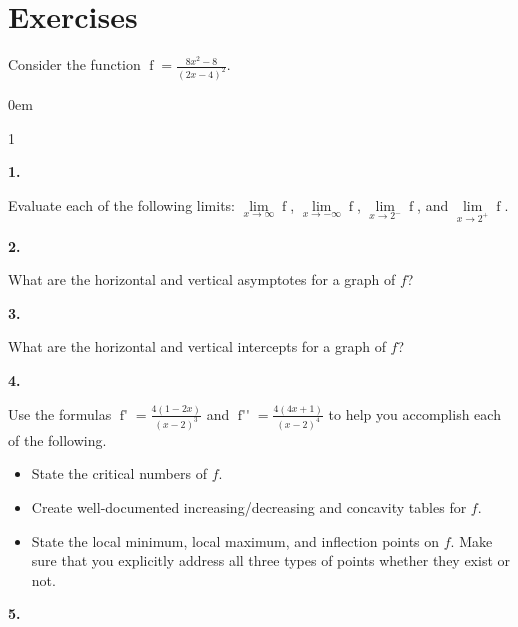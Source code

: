 \documentclass[12pt,]{book}
\theoremstyle{plain}
\theoremstyle{definition}
\numberwithin{equation}{section}
\newenvironment{exercisegroup}%
{\medskip\noindent}%
{\par\bigskip}%
\newlength{\exercisegroupindent}%
\newlength{\exercisegroupitemwidth}%
\newenvironment{exercisegrouplist}%
{\vspace{-\partopsep}%
\begin{adjustwidth}{\exercisegroupindent}{0em}}%
{\end{adjustwidth}%
\vspace{-\partopsep}%
\vspace{\baselineskip}}%
\newenvironment{exercisegroupbycol}[1]%
{\begin{exercisegrouplist}%
\vspace{-\multicolsep}%
\begin{multicols}{#1}%
\setlength{\parindent}{0em}%
\setlength{\exercisegroupitemwidth}{\linewidth}}%
{\end{multicols}%
\vspace{-\multicolsep}%
\end{exercisegrouplist}}%
\newenvironment{exercisegroupitem}[1]%
{\begin{minipage}[t]{\exercisegroupitemwidth}
\vspace{0pt}%
{\bfseries#1}%
\rule{0pt}{\baselineskip}}{\strut%
\end{minipage}%
\hspace{\columnsep}}%
\providecommand\phantomsection{}
\newcommand{\fe}[2]{\mathop{{#1}{\left(#2\right)}}}
\newcommand{\fd}[1]{#1'}
\newcommand{\sd}[1]{#1''}
\begin{document}
\section*{Exercises}\label{exercises-52}

\begin{exercisegroup}%
Consider the function \(\fe{f}{x}=\frac{8x^2-8}{(2x-4)^2}\).%
\par
\begin{exercisegroupbycol}{1}%
\begin{exercisegroupitem}{1. }\phantomsection\hypertarget{exercise-sketch-first-asymptotes}{\null}
Evaluate each of the following limits: \(\lim\limits_{x\to\infty}\fe{f}{x}\), \(\lim\limits_{x\to-\infty}\fe{f}{x}\), \(\lim\limits_{x\to2^{-}}\fe{f}{x}\), and \(\lim\limits_{x\to2^{+}}\fe{f}{x}\).%
\end{exercisegroupitem}%
\par%
\begin{exercisegroupitem}{2. }\phantomsection\hypertarget{exercise-450}{\null}
What are the horizontal and vertical asymptotes for a graph of \(f\)?%
\end{exercisegroupitem}%
\par%
\begin{exercisegroupitem}{3. }\phantomsection\hypertarget{exercise-451}{\null}
What are the horizontal and vertical intercepts for a graph of \(f\)?%
\end{exercisegroupitem}%
\par%
\begin{exercisegroupitem}{4. }\phantomsection\hypertarget{exercise-sketch-first-critical-numbers}{\null}
Use the formulas \(\fe{\fd{f}}{x}=\frac{4(1-2x)}{(x-2)^3}\) and \(\fe{\sd{f}}{x}=\frac{4(4x+1)}{(x-2)^4}\) to help you accomplish each of the following.%
\begin{itemize}[label=\textbullet]
\item{}State the critical numbers of \(f\).\item{}Create well-documented increasing/decreasing and concavity tables for \(f\).\item{}State the local minimum, local maximum, and inflection points on \(f\).  Make sure that you explicitly address all three types of points whether they exist or not.\end{itemize}
\end{exercisegroupitem}%
\par%
\begin{exercisegroupitem}{5. }\phantomsection\hypertarget{exercise-453}{\null}

\end{exercisegroupitem}
\end{exercisegroupbycol}
\end{exercisegroup}
\end{document}

